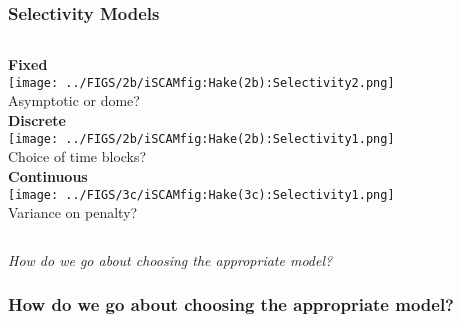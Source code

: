 \documentclass{beamer}
\begin{document}
\begin{frame}[m]\frametitle{Selectivity Models}
    
\begin{columns}
		\textbf{Fixed}\\
		\texttt{[image: ../FIGS/2b/iSCAMfig:Hake(2b):Selectivity2.png]}\\
		Asymptotic or dome?\\
	
	
		\textbf{Discrete}\\
		\texttt{[image: ../FIGS/2b/iSCAMfig:Hake(2b):Selectivity1.png]}\\
		Choice of time blocks?\\
	
	
		\textbf{Continuous}\\
		\texttt{[image: ../FIGS/3c/iSCAMfig:Hake(3c):Selectivity1.png]}\\
		Variance on penalty?\\
	
\end{columns}
\vfill
\emph{How do we go about choosing the appropriate model?}
\end{frame}

\begin{frame}[m]\frametitle{How do we go about choosing the appropriate model?}
\end{frame}


\end{document}
